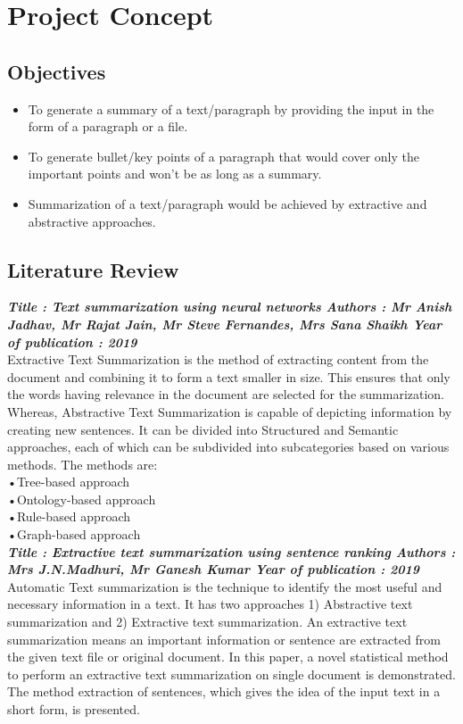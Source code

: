 \chapter{Project Concept}
\section{Objectives}
\begin{itemize}
    \item To generate a summary of a text/paragraph by providing the input in the form of a paragraph or a file.
    \item To generate bullet/key points of a paragraph that would cover only the important points and won’t be as long as a summary.
    \item Summarization of a text/paragraph would be achieved by extractive and abstractive approaches.
\end{itemize}

  


\section{Literature Review}
\textbf{\textit{   Title : Text summarization using neural networks
Authors : Mr Anish Jadhav, Mr Rajat Jain, Mr Steve Fernandes, Mrs Sana Shaikh
Year of publication : 2019}}\\
Extractive Text Summarization is the method of extracting content from the document and combining it to form a text smaller in size. This ensures that only the words having relevance in the document are selected for the summarization. 
Whereas, Abstractive Text Summarization is capable of depicting information by creating new sentences. It can be divided into Structured and Semantic approaches, each of which  can be subdivided into subcategories based on various methods.
The methods are:\\
•Tree-based approach\\
•Ontology-based approach\\
•Rule-based approach\\
•Graph-based approach  \\      

\textbf{\textit{Title : Extractive text summarization using sentence ranking
Authors : Mrs J.N.Madhuri, Mr Ganesh Kumar
Year of publication : 2019}}\\
Automatic Text summarization is the technique to identify the most useful and necessary information in a text. It has two approaches 1) Abstractive text summarization and 2) Extractive text summarization. An extractive text summarization means an important information or sentence are extracted from the given text file or original document. In this paper, a novel statistical method to perform an extractive text summarization on single document is demonstrated. The method extraction of sentences, which gives the idea of the input text in a short form, is presented.\\
 
